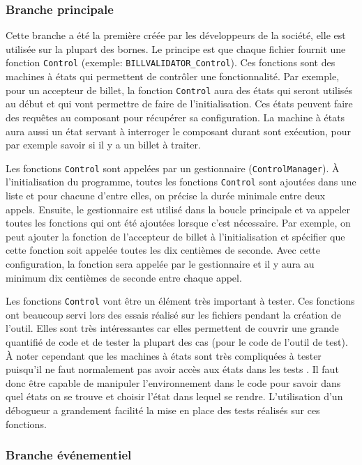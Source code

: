 \documentclass[a4paper]{article}
\begin{document}
\subsubsection*{Branche principale}

Cette branche a été la première créée par les développeurs de la société, elle
est utilisée sur la plupart des bornes. Le principe est que chaque fichier
fournit une fonction \verb|Control| (exemple: \verb|BILLVALIDATOR_Control|). Ces
fonctions sont des machines à états qui permettent de contrôler une
fonctionnalité. Par exemple, pour un accepteur de billet, la fonction
\verb|Control| aura des états qui seront utilisés au début et qui vont permettre
de faire de l'initialisation. Ces états peuvent faire des requêtes au composant
pour récupérer sa configuration. La machine à états aura aussi un état servant à
interroger le composant durant sont exécution, pour par exemple savoir si il y a
un billet à traiter.

Les fonctions \verb|Control| sont appelées par un gestionnaire
(\verb|ControlManager|). À l'initialisation du programme, toutes les fonctions
\verb|Control| sont ajoutées dans une liste et pour chacune d'entre elles, on
précise la durée minimale entre deux appels. Ensuite, le gestionnaire est
utilisé dans la boucle principale et va appeler toutes les fonctions qui ont été
ajoutées lorsque c'est nécessaire. Par exemple, on peut ajouter la fonction de
l'accepteur de billet à l'initialisation et spécifier que cette fonction soit
appelée toutes les dix centièmes de seconde. Avec cette configuration, la
fonction sera appelée par le gestionnaire et il y aura au minimum dix centièmes
de seconde entre chaque appel.

Les fonctions \verb|Control| vont être un élément très important à tester. Ces
fonctions ont beaucoup servi lors des essais réalisé sur les fichiers pendant la
création de l'outil. Elles sont très intéressantes car elles permettent de
couvrir une grande quantifié de code et de tester la plupart des cas (pour le
code de l'outil de test). À noter cependant que les machines à états sont très
compliquées à tester puisqu'il ne faut normalement pas avoir accès aux états
dans les tests \cite{teststatemachines}. Il faut donc être capable de manipuler
l'environnement dans le code pour savoir dans quel états on se trouve et choisir
l'état dans lequel se rendre. L'utilisation d'un débogueur a grandement facilité
la mise en place des tests réalisés sur ces fonctions.

\subsubsection{Branche événementiel}
\label{brancheevent}
\end{document}
